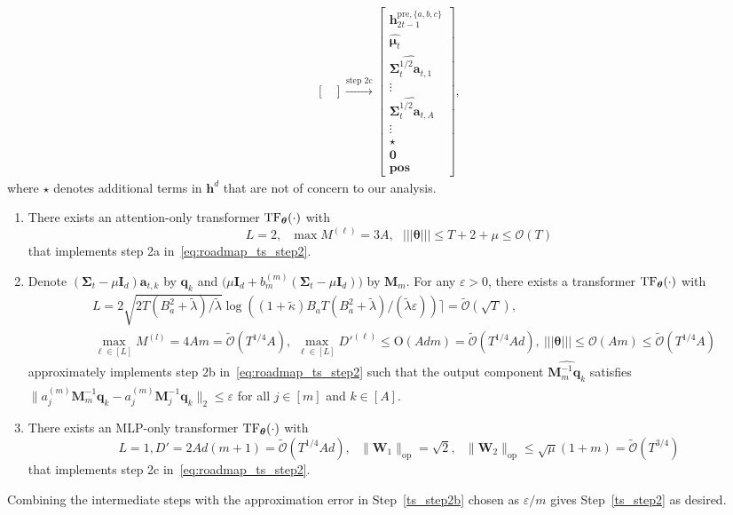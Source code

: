 \documentclass[10pt]{article}
\newcommand{\id}{\bI}
\newcommand{\eps}{\varepsilon}
\newcommand{\lops}[1]{\|{#1}\|_{\mathrm{op}}}
\renewcommand{\cO}{\mathcal{O}}
\newcommand{\<}{\left\langle}
\renewcommand{\>}{\right\rangle}
\newcommand{\lth}{{(\ell)}}
\newcommand{\TF}{{\rm TF}}
\newcommand{\bzero}{{\mathbf 0}}
\newcommand{\nrmp}[1]{{\left|\!\left|\!\left|{#1}\right|\!\right|\!\right|}}
\newcommand{\pre}{{\mathrm{pre}}}
\newcommand{\posv}{{\mathbf{pos}}}
\newcommand{\parta}{{a}}
\newcommand{\partb}{{b}}
\newcommand{\partc}{{c}}
\newcommand{\partd}{{d}}
\newcommand{\Tpsmean}{{{\mathbf\mu}}}
\newcommand{\Tpscov}{{{\mathbf\Sigma}}}
\newcommand{\prodeig}{{\mu}}
\newcommand{\padecond}{{\tilde \kappa}}
\newcommand{\intvec}{{\mathbf {q}}}
\newcommand{\intmat}{{\mathbf {M}}}
\newcommand{\tcO}{{\tilde{\mathcal O}}}
\newcommand{\hidden}{{D'}}
\newcommand{\conO}{{\mathrm{O}}}
\def\bI{{\mathbf I}}
\def\bW{{\mathbf W}}
\def\btheta{{\boldsymbol \theta}}
\def\ba{{\mathbf a}}
\def\bh{{\mathbf h}}
\begin{document}
\begin{align}
\begin{bmatrix}
\end{bmatrix}
\xrightarrow{\text{step 2c}}
   \begin{bmatrix}
    \bh_{2t-1}^{\pre,\{\parta,\partb,\partc\}}\\\widehat{\Tpsmean_t} 
        \\
\widehat{\Tpscov_t^{1/2}\ba_{t,1}}
\\\vdots\\
         \widehat{\Tpscov_t^{1/2}\ba_{t,A}}\\\vdots\\
        \star\\ \bzero \\\posv
\end{bmatrix}\label{eq:roadmap_ts_step2},
\end{align}
where $\star$ denotes additional terms in $\bh^\partd$ that are not of concern to our analysis.

\begin{enumerate}[label=Step 2\alph*,ref= 2\alph*]
        \item\label{ts_step2a}  There exists an attention-only transformer $\TF_\btheta(\cdot)$ with     $$L=2,~~~\max M^{\lth}=3A,~~~ \nrmp{\btheta}\leq T+2+{\prodeig}\leq\cO(T) $$
 that implements step 2a in~\eqref{eq:roadmap_ts_step2}.
     \item\label{ts_step2b} Denote ${(\Tpscov_t-\prodeig\id_d)\ba_{t,k}}$ by  $\intvec_{k}$ and $\Big({\prodeig}\id_d+{b_m^{(m)}(\Tpscov_t-\prodeig \id_d)}\Big)$ by $\intmat_m$. For any $\eps>0$,   there exists a  transformer $\TF_\btheta(\cdot)$ with    
     \begin{align*}
     &L=2\sqrt{2 T(B_a^2+\tilde\lambda)/\tilde\lambda}\log((1+\padecond)B_aT(B_a^2+\tilde\lambda)/(\tilde\lambda\eps))\rceil=\tcO(\sqrt{T}),\\  &
     \max_{\ell\in[L]}M^{(l)}=4Am=\tcO(T^{1/4}A),~\max_{\ell\in[L]}\hidden^\lth\leq \conO(Adm)=\tcO(T^{1/4}Ad),~ \nrmp{\btheta}\leq  \cO(Am)\leq  \tcO(T^{1/4}A)
     \end{align*}
     approximately implements step 2b in~\eqref{eq:roadmap_ts_step2} such that the output component $\widehat{\intmat_m^{-1}\intvec_k}$ satisfies $\|\widehat{a_j^{(m)}\intmat_m^{-1}\intvec_k}-{a_j^{(m)}\intmat_j^{-1}\intvec_k}\|_2\leq\eps$ for all $j\in[m]$ and $k\in[A]$.
 \item\label{ts_step2c}  There exists an MLP-only transformer $\TF_\btheta(\cdot)$ with     $$L=1,D'=2Ad(m+1)=\tcO(T^{1/4}Ad),~~~\lops{\bW_1}=\sqrt{2}, ~~~\lops{\bW_2}\leq \sqrt{\prodeig}(1+m)=\tcO(T^{3/4})$$  that implements step 2c in~\eqref{eq:roadmap_ts_step2}.
\end{enumerate}
Combining the intermediate steps with the approximation error in Step~\ref{ts_step2b} chosen as $\eps/m$  gives Step~\ref{ts_step2} as desired.
\end{document}
